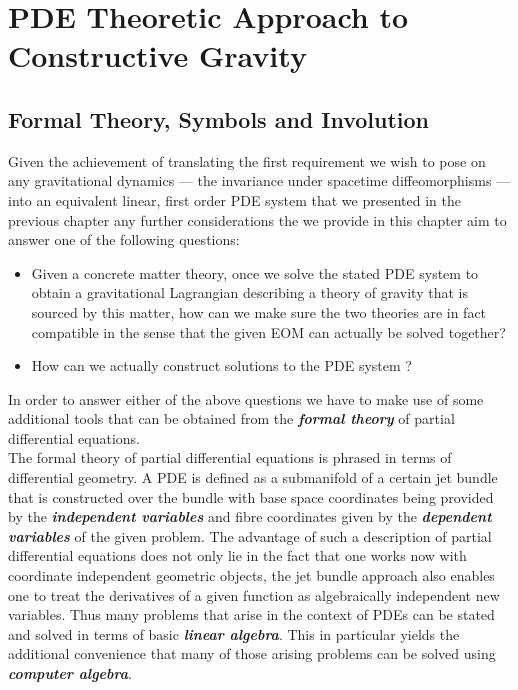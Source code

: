 \documentclass[a4paper,12pt, DIV=14, BCOR=5mm, twoside, headsepline]{scrbook}
\begin{document}
\chapter{PDE Theoretic Approach to Constructive Gravity}
\section{Formal Theory, Symbols and Involution}
Given the achievement of translating the first requirement we wish to pose on any gravitational dynamics --- the invariance under spacetime diffeomorphisms --- into an equivalent linear, first order PDE system that we presented in the previous chapter any further considerations the we provide in this chapter aim to answer one of the following questions:
\begin{itemize}
    \item Given a concrete matter theory, once we solve the stated PDE system to obtain a gravitational Lagrangian describing a theory of gravity that is sourced by this matter, how can we make sure the two theories are in fact compatible in the sense that the given EOM can actually be solved together?
    \item How can we actually construct solutions to the PDE system ?
\end{itemize}
In order to answer either of the above questions we have to make use of some additional tools that can be obtained from the \textit{\textbf{formal theory}} of partial differential equations.\\

The formal theory of partial differential equations is phrased in terms of differential geometry. A PDE is defined as a submanifold of a certain jet bundle that is constructed over the bundle with base space coordinates being provided by the \textit{\textbf{independent variables}} and fibre coordinates given by the \textit{\textbf{dependent variables}} of the given problem. The advantage of such a description of partial differential equations does not only lie in the fact that one works now with coordinate independent geometric objects, the jet bundle approach also enables one to treat the derivatives of a given function as algebraically independent new variables. Thus many problems that arise in the context of PDEs can be stated and solved in terms of basic \textit{\textbf{linear algebra}}. This in particular yields the additional convenience that many of those arising problems can be solved using \textbf{\textit{computer algebra}}.
\end{document}
